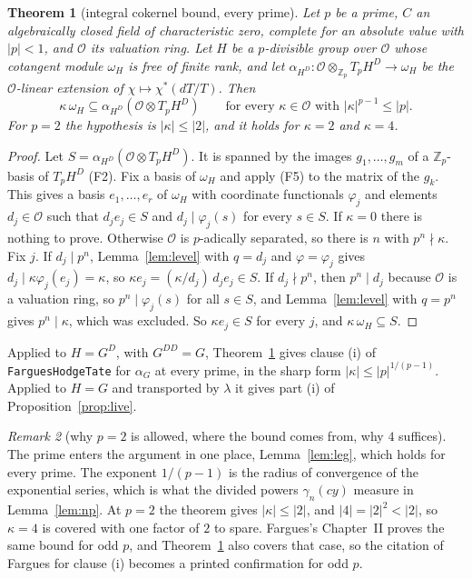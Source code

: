 \documentclass[11pt]{article}
\newcommand{\lean}[1]{\nolinkurl{#1}}
\newtheorem{theorem}{Theorem}
\theoremstyle{definition}
\theoremstyle{remark}
\newtheorem{remark}[theorem]{Remark}
\newcommand{\cO}{\mathcal O}
\begin{document}
\begin{theorem}[integral cokernel bound, every prime]\label{thm:A}
Let $p$ be a prime, $C$ an algebraically closed field of characteristic zero, complete for an absolute value with $\lvert p\rvert<1$, and $\cO$ its valuation ring. Let $H$ be a $p$-divisible group over $\cO$ whose cotangent module $\omega_H$ is free of finite rank, and let $\alpha_{H^D}\colon\cO\otimes_{\mathbb Z_p}T_pH^D\to\omega_H$ be the $\cO$-linear extension of $\chi\mapsto\chi^*(dT/T)$. Then
\[
\kappa\,\omega_H\subseteq\alpha_{H^D}(\cO\otimes T_pH^D)\qquad\text{for every }\kappa\in\cO\text{ with }\lvert\kappa\rvert^{p-1}\le\lvert p\rvert .
\]
For $p=2$ the hypothesis is $\lvert\kappa\rvert\le\lvert2\rvert$, and it holds for $\kappa=2$ and $\kappa=4$.
\end{theorem}

\begin{proof}
Let $S=\alpha_{H^D}(\cO\otimes T_pH^D)$. It is spanned by the images $g_1,\dots,g_m$ of a $\mathbb Z_p$-basis of $T_pH^D$ (F2). Fix a basis of $\omega_H$ and apply (F5) to the matrix of the $g_k$. This gives a basis $e_1,\dots,e_r$ of $\omega_H$ with coordinate functionals $\varphi_j$ and elements $d_j\in\cO$ such that $d_je_j\in S$ and $d_j\mid\varphi_j(s)$ for every $s\in S$. If $\kappa=0$ there is nothing to prove. Otherwise $\cO$ is $p$-adically separated, so there is $n$ with $p^n\nmid\kappa$. Fix $j$. If $d_j\mid p^n$, Lemma~\ref{lem:level} with $q=d_j$ and $\varphi=\varphi_j$ gives $d_j\mid\kappa\varphi_j(e_j)=\kappa$, so $\kappa e_j=(\kappa/d_j)\,d_je_j\in S$. If $d_j\nmid p^n$, then $p^n\mid d_j$ because $\cO$ is a valuation ring, so $p^n\mid\varphi_j(s)$ for all $s\in S$, and Lemma~\ref{lem:level} with $q=p^n$ gives $p^n\mid\kappa$, which was excluded. So $\kappa e_j\in S$ for every $j$, and $\kappa\,\omega_H\subseteq S$.
\end{proof}

Applied to $H=G^D$, with $G^{DD}=G$, Theorem~\ref{thm:A} gives clause (i) of \lean{FarguesHodgeTate} for $\alpha_G$ at every prime, in the sharp form $\lvert\kappa\rvert\le\lvert p\rvert^{1/(p-1)}$. Applied to $H=G$ and transported by $\lambda$ it gives part (i) of Proposition~\ref{prop:live}.

\begin{remark}[why $p=2$ is allowed, where the bound comes from, why $4$ suffices]
The prime enters the argument in one place, Lemma~\ref{lem:leg}, which holds for every prime. The exponent $1/(p-1)$ is the radius of convergence of the exponential series, which is what the divided powers $\gamma_n(cy)$ measure in Lemma~\ref{lem:np}. At $p=2$ the theorem gives $\lvert\kappa\rvert\le\lvert2\rvert$, and $\lvert4\rvert=\lvert2\rvert^2<\lvert2\rvert$, so $\kappa=4$ is covered with one factor of $2$ to spare. Fargues's Chapter~II proves the same bound for odd $p$, and Theorem~\ref{thm:A} also covers that case, so the citation of Fargues for clause (i) becomes a printed confirmation for odd $p$.
\end{remark}
\end{document}
